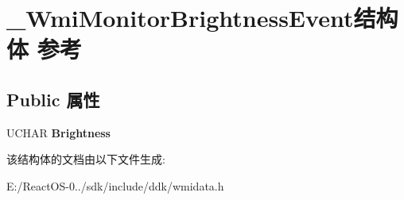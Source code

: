 \hypertarget{struct___wmi_monitor_brightness_event}{}\section{\+\_\+\+Wmi\+Monitor\+Brightness\+Event结构体 参考}
\label{struct___wmi_monitor_brightness_event}
\subsection*{Public 属性}
\begin{DoxyCompactItemize}
\item 
\mbox{\label{struct___wmi_monitor_brightness_event_a3bab6bd31d95bc7282cfb607c34eedf4}} 
U\+C\+H\+AR {\bfseries Brightness}
\end{DoxyCompactItemize}


该结构体的文档由以下文件生成\+:\begin{DoxyCompactItemize}
\item 
E\+:/\+React\+O\+S-\/0../sdk/include/ddk/wmidata.\+h\end{DoxyCompactItemize}
